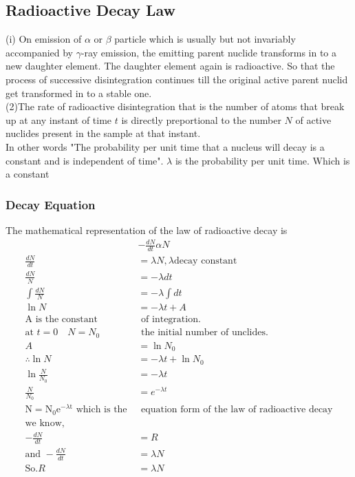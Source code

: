 \subsection{Radioactive Decay Law}
(i) \quad On emission of $\alpha$ or $\beta$ particle which is usually but not invariably accompanied by $\gamma$-ray emission, the emitting parent nuclide transforms in to a new daughter element. The daughter element again is radioactive. So that the process of successive disintegration continues till the original active parent nuclid get transformed in to a stable one.\\
(2)\quad The rate of radioactive disintegration that is the number of atoms that break up at any instant of time $t$ is directly preportional to the number $N$ of active nuclides present in the sample at that instant.\\
In other words "The probability per unit time that a nucleus will decay is a constant and is independent of time". $\lambda$ is the probability per unit time. Which is a constant \\
\subsubsection{Decay Equation}
The mathematical representation of the law of radioactive decay is 
\begin{align}
&-\frac{d N}{d t} \alpha N\\
\frac{d N}{d t}&=\lambda N, \lambda \text{decay constant}\\
\frac{d N}{N}&=-\lambda d t\\
\int \frac{d N}{N}&=-\lambda \int d t\\
\ln N&=-\lambda t+A\\
\text{A is the constant}&\text{ of integration.}\\
\text{at $t=0 \quad N=N_{0}$}&\text{ the initial number of unclides.}\\
A&=\ln N_{0}\\
\therefore \ln N&=-\lambda t+\ln N _0\\
\ln \frac{N }{ N_{0}}&=-\lambda t\\
\frac{N}{N_0}&=e^{-\lambda t}\\
\text{$\mathrm{N}=\mathrm{N}_{0} \mathrm{e}^{-\lambda \mathrm{t}}$ which is the }&\text{  equation form of the law of radioactive decay}\\
\text{we know,}\quad\\
-\frac{d N}{d t}&=R \label{nuclear decay eq}\\
\text{and }-\frac{d N}{d t}&=\lambda N\label{nuclear decay eq 2}\\
\text{So.} R&=\lambda N
\end{align}
